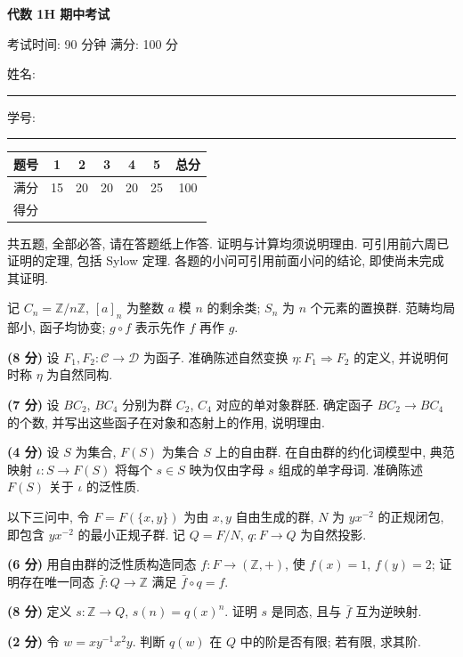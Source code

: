 \documentclass[UTF8,a4paper,zihao=5]{ctexart}
\newcommand{\question}[2]{%
  \par\addvspace{.8\baselineskip}%
  \noindent{\large\bfseries\heiti 第 #1 题\hfill (#2 分)}\par\nobreak\smallskip
}
\newcommand{\points}[1]{{\bfseries\heiti (#1 分)}}
\begin{document}
{\centering
  {\LARGE\bfseries\heiti 代数 1H 期中考试\par}
  \smallskip
  考试时间: 90 分钟 \qquad 满分: 100 分\par
}

\medskip
姓名: \rule[-.4ex]{3.4cm}{.4pt}\hfill 学号: \rule[-.4ex]{4.7cm}{.4pt}

\begin{center}
  \renewcommand{\arraystretch}{1.15}
  \begin{tabular}{c|ccccc|c}
    \hline
    题号 & 1 & 2 & 3 & 4 & 5 & 总分 \\
    \hline
    满分 & 15 & 20 & 20 & 20 & 25 & 100 \\
    得分 & & & & & & \\
    \hline
  \end{tabular}
\end{center}

共五题, 全部必答, 请在答题纸上作答. 证明与计算均须说明理由. 可引用前六周已证明的定理, 包括 Sylow 定理. 各题的小问可引用前面小问的结论, 即使尚未完成其证明.

记 $C_n=\mathbb{Z}/n\mathbb{Z}$, $[a]_n$ 为整数 $a$ 模 $n$ 的剩余类; $S_n$ 为 $n$ 个元素的置换群. 范畴均局部小, 函子均协变; $g\circ f$ 表示先作 $f$ 再作 $g$.

\question{1}{15}
\begin{parts}
  \item \points{8} 设 $F_1,F_2:\mathcal{C}\to\mathcal{D}$ 为函子. 准确陈述自然变换 $\eta:F_1\Rightarrow F_2$ 的定义, 并说明何时称 $\eta$ 为自然同构.
  \item \points{7} 设 $BC_2$, $BC_4$ 分别为群 $C_2$, $C_4$ 对应的单对象群胚. 确定函子 $BC_2\to BC_4$ 的个数, 并写出这些函子在对象和态射上的作用, 说明理由.
\end{parts}

\question{2}{20}
\begin{parts}
  \item \points{4} 设 $S$ 为集合, $F(S)$ 为集合 $S$ 上的自由群. 在自由群的约化词模型中, 典范映射 $\iota:S\to F(S)$ 将每个 $s\in S$ 映为仅由字母 $s$ 组成的单字母词. 准确陈述 $F(S)$ 关于 $\iota$ 的泛性质.
\end{parts}

以下三问中, 令 $F=F(\{x,y\})$ 为由 $x,y$ 自由生成的群, $N$ 为 $yx^{-2}$ 的正规闭包, 即包含 $yx^{-2}$ 的最小正规子群. 记 $Q=F/N$, $q:F\to Q$ 为自然投影.

\begin{parts}[resume]
  \item \points{6} 用自由群的泛性质构造同态 $f:F\to(\mathbb{Z},+)$, 使 $f(x)=1$, $f(y)=2$; 证明存在唯一同态 $\bar{f}:Q\to\mathbb{Z}$ 满足 $\bar{f}\circ q=f$.
  \item \points{8} 定义 $s:\mathbb{Z}\to Q$, $s(n)=q(x)^n$. 证明 $s$ 是同态, 且与 $\bar{f}$ 互为逆映射.
  \item \points{2} 令 $w=xy^{-1}x^2y$. 判断 $q(w)$ 在 $Q$ 中的阶是否有限; 若有限, 求其阶.
\end{parts}
\end{document}
